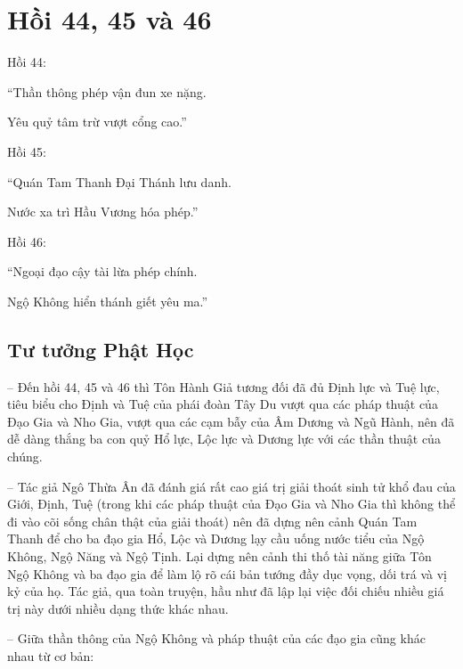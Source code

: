 \chapter{Hồi 44, 45 và 46} %
\label{cha:hoi_44_45}

Hồi 44:

\begin{itshape}
``Thần thông phép vận đun xe nặng.

Yêu quỷ tâm trừ vượt cổng cao.''
\end{itshape}

Hồi 45:

\begin{itshape}
``Quán Tam Thanh Đại Thánh lưu danh.

Nước xa trì Hầu Vương hóa phép.''
\end{itshape}

Hồi 46:

\begin{itshape}
``Ngoại đạo cậy tài lừa phép chính.

Ngộ Không hiển thánh giết yêu ma.''
\end{itshape}

\section{Tư tưởng Phật Học} %
\label{sec:44_45_phat_hoc}

-- Đến hồi 44, 45 và 46 thì Tôn Hành Giả tương đối đã đủ Định lực và Tuệ lực, tiêu biểu cho Định và Tuệ của phái đoàn Tây Du vượt qua các pháp thuật của Đạo Gia và Nho Gia, vượt qua các cạm bẫy của Âm Dương và Ngũ Hành, nên đã dễ dàng thắng ba con quỷ Hổ lực, Lộc lực và Dương lực với các thần thuật của chúng.

-- Tác giả Ngô Thừa Ân đã đánh giá rất cao giá trị giải thoát sinh tử khổ đau của Giới, Định, Tuệ (trong khi các pháp thuật của Đạo Gia và Nho Gia thì không thể đi vào cõi sống chân thật của giải thoát) nên đã dựng nên cảnh Quán Tam Thanh để cho ba đạo gia Hổ, Lộc và Dương lạy cầu uống nước tiểu của Ngộ Không, Ngộ Năng và Ngộ Tịnh. Lại dựng nên cảnh thi thố tài năng giữa Tôn Ngộ Không và ba đạo gia để làm lộ rõ cái bản tướng đầy dục vọng, dối trá và vị kỷ của họ. Tác giả, qua toàn truyện, hầu như đã lập lại việc đối chiếu nhiều giá trị này dưới nhiều dạng thức khác nhau.

-- Giữa thần thông của Ngộ Không và pháp thuật của các đạo gia cũng khác nhau từ cơ bản:

